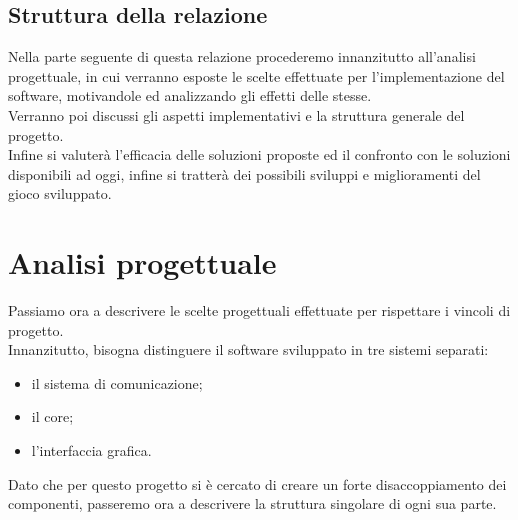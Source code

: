 \documentclass{llncs}
\begin{document}
\subsection{Struttura della relazione}
Nella parte seguente di questa relazione procederemo innanzitutto all'analisi progettuale, in cui verranno esposte le scelte effettuate per l'implementazione del software, motivandole ed analizzando gli effetti delle stesse.\\
Verranno poi discussi gli aspetti implementativi e la struttura generale del progetto.\\
Infine si valuterà l'efficacia delle soluzioni proposte ed il confronto con le soluzioni disponibili ad oggi, infine si tratterà dei possibili sviluppi e miglioramenti del gioco sviluppato.

\section{Analisi progettuale}
Passiamo ora a descrivere le scelte progettuali effettuate per rispettare i vincoli di progetto.\\
Innanzitutto, bisogna distinguere il software sviluppato in tre sistemi separati:
\begin{itemize}
	\item il sistema di comunicazione;
	\item il core;
	\item l'interfaccia grafica.
\end{itemize}
Dato che per questo progetto si è cercato di creare un forte disaccoppiamento dei componenti, passeremo ora a descrivere la struttura singolare di ogni sua parte.
\end{document}

